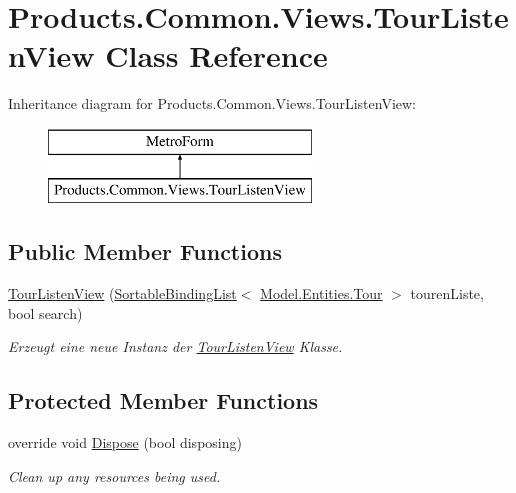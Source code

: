 \hypertarget{class_products_1_1_common_1_1_views_1_1_tour_listen_view}{}\section{Products.\+Common.\+Views.\+Tour\+Listen\+View Class Reference}
\label{class_products_1_1_common_1_1_views_1_1_tour_listen_view}
Inheritance diagram for Products.\+Common.\+Views.\+Tour\+Listen\+View\+:\begin{figure}[H]
\begin{center}
\leavevmode
\includegraphics[height=2.000000cm]{class_products_1_1_common_1_1_views_1_1_tour_listen_view}
\end{center}
\end{figure}
\subsection*{Public Member Functions}
\begin{DoxyCompactItemize}
\item 
\hyperlink{class_products_1_1_common_1_1_views_1_1_tour_listen_view_a8f614fddeda5aba44dbac1417ff7c362}{Tour\+Listen\+View} (\hyperlink{class_products_1_1_common_1_1_sortable_binding_list}{Sortable\+Binding\+List}$<$ \hyperlink{class_products_1_1_model_1_1_entities_1_1_tour}{Model.\+Entities.\+Tour} $>$ touren\+Liste, bool search)
\begin{DoxyCompactList}\small\item\em Erzeugt eine neue Instanz der \hyperlink{class_products_1_1_common_1_1_views_1_1_tour_listen_view}{Tour\+Listen\+View} Klasse. \end{DoxyCompactList}\end{DoxyCompactItemize}
\subsection*{Protected Member Functions}
\begin{DoxyCompactItemize}
\item 
override void \hyperlink{class_products_1_1_common_1_1_views_1_1_tour_listen_view_a951f5344e3b3944a5752becea92e6d86}{Dispose} (bool disposing)
\begin{DoxyCompactList}\small\item\em Clean up any resources being used. \end{DoxyCompactList}\end{DoxyCompactItemize}
